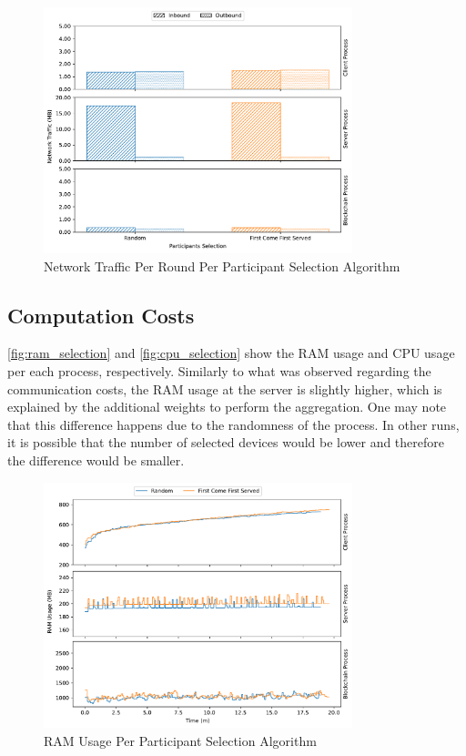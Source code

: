 \begin{figure}[!hpt]
    \centering
    \centering
    \includegraphics[width=0.8\textwidth]{graphics/selection/net.pdf}
    \caption{Network Traffic Per Round Per Participant Selection Algorithm}
    \label{fig:net_selection}
\end{figure}

\subsection{Computation Costs}

\autoref{fig:ram_selection} and \autoref{fig:cpu_selection} show the RAM usage and CPU usage per each process, respectively. Similarly to what was observed regarding the communication costs, the RAM usage at the server is slightly higher, which is explained by the additional weights to perform the aggregation. One may note that this difference happens due to the randomness of the process. In other runs, it is possible that the number of selected devices would be lower and therefore the difference would be smaller.

\begin{figure}[!hpb]
    \centering
    \centering
    \includegraphics[width=0.8\textwidth]{graphics/selection/ram.pdf}
    \caption{RAM Usage Per Participant Selection Algorithm}
    \label{fig:ram_selection}
\end{figure}

